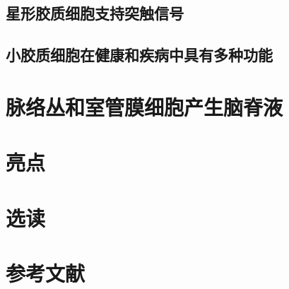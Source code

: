 \subsection{星形胶质细胞支持突触信号}
\subsection{小胶质细胞在健康和疾病中具有多种功能}

\section{脉络丛和室管膜细胞产生脑脊液}

\section{亮点}

\section{选读}

\section{参考文献}

